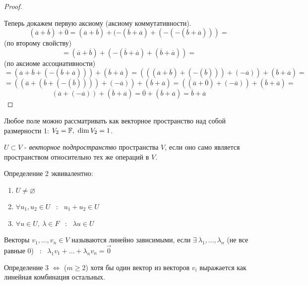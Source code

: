 \begin{definition}
\begin{proof}
\begin{enumerate}
      \end{enumerate}
      Теперь докажем первую аксиому (аксиому коммутативности).
      $$(\overline{a}+\overline{b})+\overline{0} = (\overline{a}+\overline{b})+(-(\overline{b}+\overline{a})+(-(-(\overline{b}+\overline{a}))) = $$
      (по второму свойству) 
      $$ = (\overline{a}+\overline{b})+(-(\overline{b}+\overline{a})+(\overline{b}+\overline{a})) = $$ 
      (по аксиоме ассоциативности) 
      $$=(\overline{a}+\overline{b}+(-(\overline{b}+\overline{a})))+(\overline{b}+\overline{a}) = (((\overline{a}+\overline{b})+(-(\overline{b})))+(-\overline{a}))+(\overline{b}+\overline{a}) = $$
      $$= ((\overline{a}+(\overline{b}+(-(\overline{b}))))+(-\overline{a}))+(\overline{b}+\overline{a}) =
      ((\overline{a}+\overline{0})+(-\overline{a}))+(\overline{b}+\overline{a}) =$$
      $$(\overline{a}+(-\overline{a}))+(\overline{b}+\overline{a})
      = \overline{0}+(\overline{b}+\overline{a}) = \overline{b}+\overline{a}$$
    \end{proof} 
  \end{definition}
  \begin{remark}
    Любое поле можно рассматривать как векторное пространство над собой размерности 1: $V_2 = \mathbb{F}, \ \dim V_2 = 1$. 
  \end{remark}
  \begin{definition}
    $U \subset  V$ - \textit{векторное подпространство} пространства $V$, если оно само является пространством относительно тех же операций в $V$. 
  \end{definition}
  \begin{subtheorem}
    Определение 2 эквивалентно:
    \begin{enumerate}
      \item $U\neq \varnothing $
      \item $\forall u_1, u_2 \in U$ \ : \  $u_1 + u_2 \in U$
      \item $\forall u \in U, \ \lambda \in F$ \ : \ $\lambda u\in U$
    \end{enumerate}
  \end{subtheorem} 
  \begin{definition}
    Векторы $v_1,...,v_n \in V$ называются линейно зависимыми, если $\exists \ \lambda_1,..., \lambda_n$ (не все равные 0) \ : \ $\lambda_1v_1+...+\lambda_nv_n = \vec 0$
  \end{definition} 
  \begin{subtheorem}
    Определение 3 $\Longleftrightarrow $ ($m\geq 2$) хотя бы один вектор из векторов $v_i$ выражается как линейная комбинация остальных. 
  \end{subtheorem}
